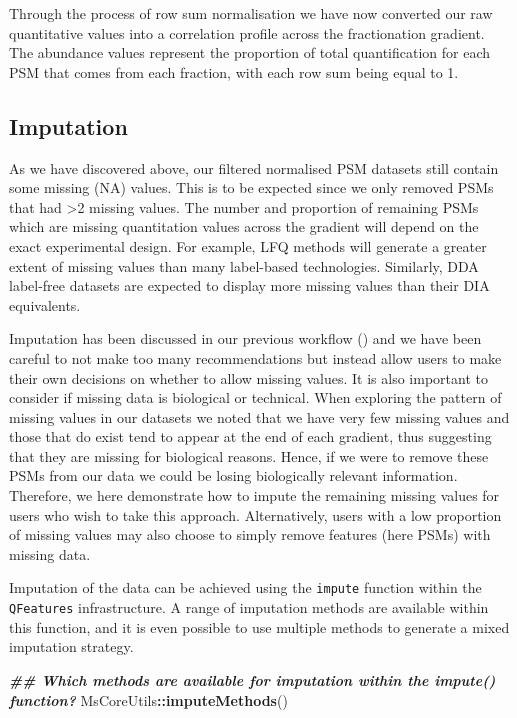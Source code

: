 \documentclass[9pt,a4paper,]{extarticle}
\newenvironment{Shaded}{\begin{snugshade}}{\end{snugshade}}
\newcommand{\DocumentationTok}[1]{\textcolor[rgb]{0.56,0.35,0.01}{\textbf{\textit{#1}}}}
\newcommand{\FunctionTok}[1]{\textcolor[rgb]{0.13,0.29,0.53}{\textbf{#1}}}
\newcommand{\NormalTok}[1]{#1}
\newcommand{\SpecialCharTok}[1]{\textcolor[rgb]{0.81,0.36,0.00}{\textbf{#1}}}
\begin{document}
Through the process of row sum normalisation we have now converted our raw
quantitative values into a correlation profile across the fractionation
gradient. The abundance values represent the proportion of total quantification
for each PSM that comes from each fraction, with each row sum being equal to 1.

\subsection{Imputation}\label{imputation}

As we have discovered above, our filtered normalised PSM datasets still contain
some missing (NA) values. This is to be expected since we only removed PSMs that
had \textgreater2 missing values. The number and proportion of remaining PSMs which are
missing quantitation values across the gradient will depend on the exact
experimental design. For example, LFQ methods will generate a greater extent of
missing values than many label-based technologies. Similarly, DDA label-free
datasets are expected to display more missing values than their DIA equivalents.

Imputation has been discussed in our previous workflow (\citet{Hutchings2023})
and we have been careful to not make too many recommendations but instead allow
users to make their own decisions on whether to allow missing values. It is also
important to consider if missing data is biological or technical. When exploring
the pattern of missing values in our datasets we noted that we have very few
missing values and those that do exist tend to appear at the end of each gradient,
thus suggesting that they are missing for biological reasons. Hence, if we were
to remove these PSMs from our data we could be losing biologically relevant
information. Therefore, we here demonstrate how to impute the remaining missing
values for users who wish to take this approach. Alternatively, users with a low
proportion of missing values may also choose to simply remove features (here
PSMs) with missing data.

Imputation of the data can be achieved using the \texttt{impute} function within the
\texttt{QFeatures} infrastructure. A range of imputation methods are available within
this function, and it is even possible to use multiple methods to generate a
mixed imputation strategy.

\begin{Shaded}
\begin{Highlighting}[]
\DocumentationTok{\#\# Which methods are available for imputation within the impute() function?}
\NormalTok{MsCoreUtils}\SpecialCharTok{::}\FunctionTok{imputeMethods}\NormalTok{()}
\end{Highlighting}
\end{Shaded}
\end{document}
